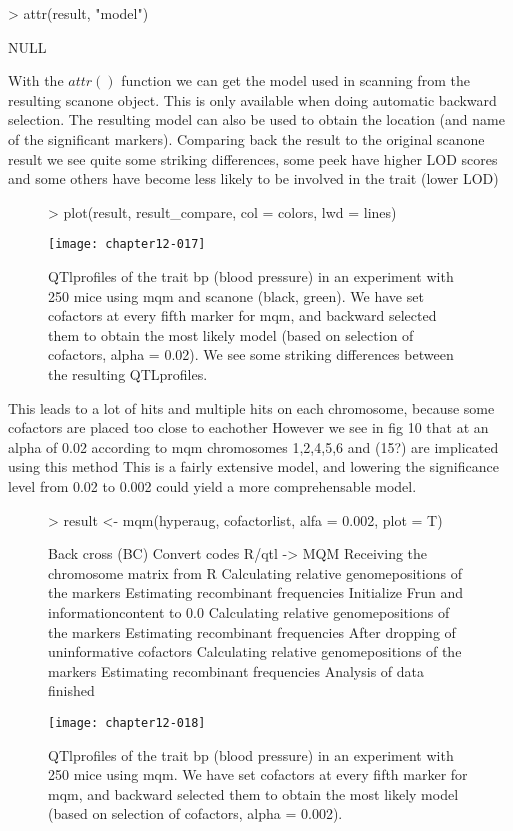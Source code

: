 \documentclass[11pt]{article}
\begin{document}
\begin{Schunk}
\begin{Sinput}
> attr(result, "model")
\end{Sinput}
\begin{Soutput}
NULL
\end{Soutput}
\end{Schunk}
With the $attr()$ function we can get the model used in scanning from the resulting scanone object. This is only available when doing automatic backward selection. The resulting model can also be used to obtain the location (and name of the significant markers).
Comparing back the result to the original scanone result we see quite some striking differences, some peek have higher LOD scores and some others have become less likely to be involved in the trait (lower LOD)
\clearpage
\begin{figure}[ht]
\begin{Schunk}
\begin{Sinput}
> plot(result, result_compare, col = colors, lwd = lines)
\end{Sinput}
\end{Schunk}
\texttt{[image: chapter12-017]}
\caption{QTlprofiles of the trait bp (blood pressure) in an experiment with 250 mice using mqm and scanone (black, green). We have set cofactors at every fifth marker for mqm, and backward selected them to obtain the most likely model (based on selection of cofactors, alpha = 0.02). We see some striking differences between the resulting QTLprofiles.}
\end{figure}
This leads to a lot of hits and multiple hits on each chromosome, because some cofactors are placed too close to eachother
However we see in fig 10 that at an alpha of 0.02 according to mqm chromosomes 1,2,4,5,6 and (15?) are implicated using this method
This is a fairly extensive model, and lowering the significance level from 0.02 to 0.002 could yield a more comprehensable model.
\begin{figure}[ht]
\begin{Schunk}
\begin{Sinput}
> result <- mqm(hyperaug, cofactorlist, alfa = 0.002, plot = T)
\end{Sinput}
\begin{Soutput}
Back cross (BC)
Convert codes R/qtl -> MQM
Receiving the chromosome matrix from R
Calculating relative genomepositions of the markers
Estimating recombinant frequencies
Initialize Frun and informationcontent to 0.0
Calculating relative genomepositions of the markers
Estimating recombinant frequencies
After dropping of uninformative cofactors
Calculating relative genomepositions of the markers
Estimating recombinant frequencies
Analysis of data finished
\end{Soutput}
\end{Schunk}
\texttt{[image: chapter12-018]}
\caption{QTlprofiles of the trait bp (blood pressure) in an experiment with 250 mice using mqm. We have set cofactors at every fifth marker for mqm, and backward selected them to obtain the most likely model (based on selection of cofactors, alpha = 0.002).
}
\end{figure}
\end{document}
